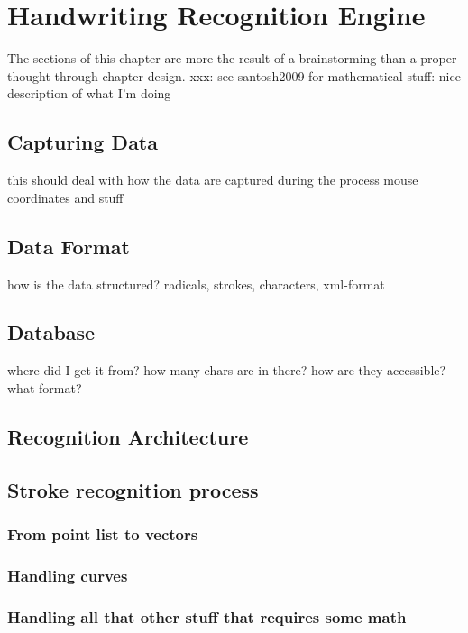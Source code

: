
\chapter{Handwriting Recognition Engine}
\label{chap:handwritingrecognitionengine}
The sections of this chapter are more the result of a brainstorming 
than a  proper thought-through chapter design.
xxx: see santosh2009 for mathematical stuff: nice description of what I'm doing

\section{Capturing Data}
this should deal with how the data are captured during the process
mouse coordinates and stuff

\section{Data Format}
how is the data structured? radicals, strokes, characters, xml-format

\section{Database}
where did I get it from? how many chars are in there?
how are they accessible? what format?

\section{Recognition Architecture}

\section{Stroke recognition process}
\subsection{From point list to vectors}
\subsection{Handling curves}
\subsection{Handling all that other stuff that requires some math}

